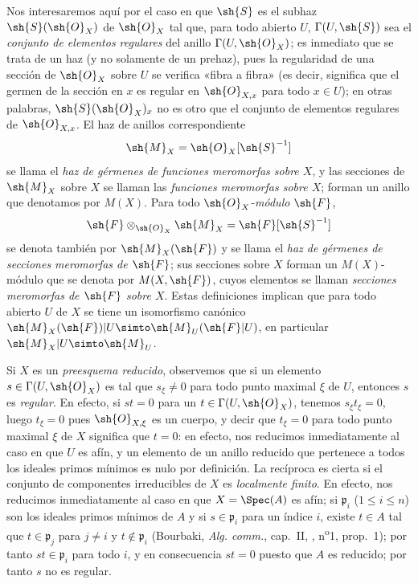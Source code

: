 \begin{env}[20.1.3]
\label{IV.20.1.3}
Nos interesaremos aquí por el caso en que $\sh{S}$ es el subhaz $\sh{S}(\sh{O}_X)$ de $\sh{O}_X$ tal que, para todo abierto $U$, $\Gamma(U,\sh{S})$ sea el \emph{conjunto de elementos regulares} del anillo $\Gamma(U,\sh{O}_X)$; es inmediato que se trata de un haz (y no solamente de un prehaz), pues la regularidad de una sección de $\sh{O}_X$ sobre $U$ se verifica «fibra a fibra» (es decir, significa que el germen de la sección en $x$ es regular en $\sh{O}_{X,x}$ para todo $x\in U$); en otras palabras, $\sh{S}(\sh{O}_X)_x$ no es otro que el conjunto de elementos regulares de $\sh{O}_{X,x}$.
El haz de anillos correspondiente
\[
  \sh{M}_X=\sh{O}_X[\sh{S}^{-1}]
\]
se llama el \emph{haz de gérmenes de funciones meromorfas sobre $X$}, y las secciones de $\sh{M}_X$ sobre $X$ se llaman las \emph{funciones meromorfas sobre $X$}; forman un anillo que denotamos por $M(X)$.
Para todo $\sh{O}_X$-\emph{módulo} $\sh{F}$,
\[
  \sh{F}\otimes_{\sh{O}_X}\sh{M}_X=\sh{F}[\sh{S}^{-1}]
\]
se denota también por $\sh{M}_X(\sh{F})$ y se llama el \emph{haz de gérmenes de secciones meromorfas de $\sh{F}$}; sus secciones sobre $X$ forman un $M(X)$-módulo que se denota por $M(X,\sh{F})$, cuyos elementos se llaman \emph{secciones meromorfas de $\sh{F}$ sobre $X$}.
Estas definiciones implican que para todo abierto $U$ de $X$ se tiene un isomorfismo canónico $\sh{M}_X(\sh{F})|U\simto\sh{M}_U(\sh{F}|U)$, en particular $\sh{M}_X|U\simto\sh{M}_U$.
\end{env}

\begin{env}[20.1.3.1]
\label{IV.20.1.3.1}
Si $X$ es un \emph{preesquema reducido}, observemos que si un elemento $s\in\Gamma(U,\sh{O}_X)$ es tal que $s_\xi\neq0$ para todo punto maximal $\xi$ de $U$, entonces $s$ es \emph{regular}.
En efecto, si $st=0$ para un $t\in\Gamma(U,\sh{O}_X)$, tenemos $s_\xi t_\xi=0$, luego $t_\xi=0$ pues $\sh{O}_{X,\xi}$ es un cuerpo, y decir que $t_\xi=0$ para todo punto maximal $\xi$ de $X$ significa que $t=0$: en efecto, nos reducimos inmediatamente al caso en que $U$ es afín, y un elemento de un anillo reducido que pertenece a todos los ideales primos mínimos es nulo por definición.
La recíproca es cierta si el conjunto de componentes irreducibles de $X$ es \emph{localmente finito}.
En efecto, nos reducimos inmediatamente al caso en que $X=\Spec(A)$ es afín; si $\mathfrak p_i$ ($1\leq i\leq n$) son los ideales primos mínimos de $A$ y si $s\in\mathfrak p_i$ para un índice $i$, existe $t\in A$ tal que $t\in\mathfrak p_j$ para $j\neq i$ y $t\notin\mathfrak p_i$ (Bourbaki, \emph{Alg. comm.}, cap.~II, , n\textsuperscript{o}1, prop.~1); por tanto $st\in\mathfrak p_i$ para todo $i$, y en consecuencia $st=0$ puesto que $A$ es reducido; por tanto $s$ no es regular.
\end{env}

